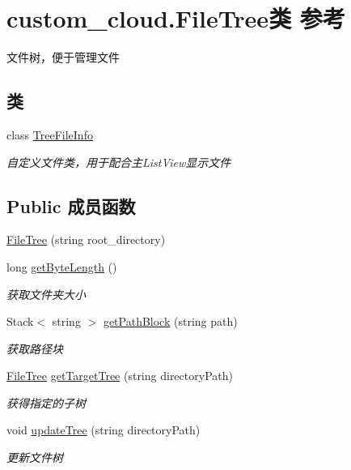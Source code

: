 \hypertarget{classcustom__cloud_1_1_file_tree}{}\section{custom\+\_\+cloud.\+File\+Tree类 参考}
\label{classcustom__cloud_1_1_file_tree}


文件树，便于管理文件  


\subsection*{类}
\begin{DoxyCompactItemize}
\item 
class \hyperlink{classcustom__cloud_1_1_file_tree_1_1_tree_file_info}{Tree\+File\+Info}
\begin{DoxyCompactList}\small\item\em 自定义文件类，用于配合主\+List\+View显示文件 \end{DoxyCompactList}\end{DoxyCompactItemize}
\subsection*{Public 成员函数}
\begin{DoxyCompactItemize}
\item 
\hyperlink{classcustom__cloud_1_1_file_tree_aad8223b6a616724c65459a65c466ed9c}{File\+Tree} (string root\+\_\+directory)
\item 
long \hyperlink{classcustom__cloud_1_1_file_tree_aac5bb07be6a4f8b47c66cc5670384b10}{get\+Byte\+Length} ()
\begin{DoxyCompactList}\small\item\em 获取文件夹大小 \end{DoxyCompactList}\item 
Stack$<$ string $>$ \hyperlink{classcustom__cloud_1_1_file_tree_a7c6226e3837b7aba681b49cb3d104fad}{get\+Path\+Block} (string path)
\begin{DoxyCompactList}\small\item\em 获取路径块 \end{DoxyCompactList}\item 
\hyperlink{classcustom__cloud_1_1_file_tree}{File\+Tree} \hyperlink{classcustom__cloud_1_1_file_tree_adededfbaf277559b9bd7c01a9da81caf}{get\+Target\+Tree} (string directory\+Path)
\begin{DoxyCompactList}\small\item\em 获得指定的子树 \end{DoxyCompactList}\item 
void \hyperlink{classcustom__cloud_1_1_file_tree_a15e1a46477dd1f518c167fae8d9e4e3a}{update\+Tree} (string directory\+Path)
\begin{DoxyCompactList}\small\item\em 更新文件树 \end{DoxyCompactList}\end{DoxyCompactItemize}
